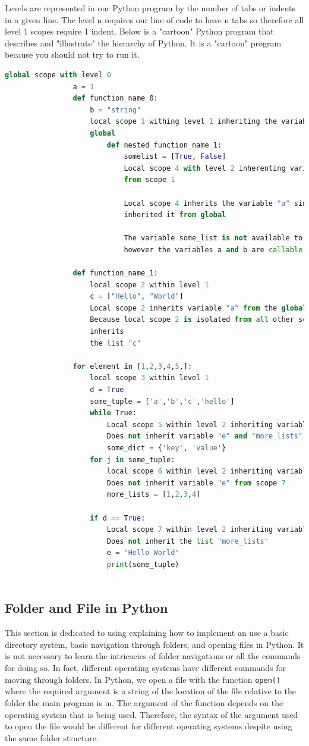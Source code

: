 \documentclass[11pt,a4paper]{book}
\begin{document}
				Levels are represented in our Python program by the number of tabs or indents in a given line. The level n requires our line of code to have n tabs so therefore all level 1 scopes require 1 indent. Below is a "cartoon" Python program that describes and "illustrate" the hierarchy of Python. It is a "cartoon" program because you should not try to run it. 
				\begin{lstlisting}[language=Python]
				global scope with level 0
				a = 1
				def function_name_0:
					b = "string"
					local scope 1 withing level 1 inheriting the variable "a" from the 
					global
						def nested_function_name_1:
							somelist = [True, False]
							Local scope 4 with level 2 inherenting variables "a" and "b" 
							from scope 1
							
							Local scope 4 inherits the variable "a" since local scope 1 
							inherited it from global
							
							The variable some_list is not available to any other scope, 
							however the variables a and b are callable within scope 4 
				
				def function_name_1:
					local scope 2 within level 1
					c = ["Hello", "World"]
					Local scope 2 inherits variable "a" from the global scope
					Because local scope 2 is isolated from all other scopes, nothing 
					inherits
					the list "c"
					
				for element in [1,2,3,4,5,]: 
					local scope 3 within level 1
					d = True
					some_tuple = ['a','b','c','hello']
					while True:
						Local scope 5 within level 2 inheriting variables "a" and "d"
						Does not inherit variable "e" and "more_lists" from scope 7
						some_dict = {'key', 'value'}
					for j in some_tuple:
						local scope 6 within level 2 inheriting variables "a" and "d"
						Does not inherit variable "e" from scope 7
						more_lists = [1,2,3,4]
						
					if d == True:
						Local scope 7 within level 2 inheriting variables "a" and "d"
						Does not inherit the list "more_lists" 
						e = "Hello World"
						print(some_tuple)
						
				\end{lstlisting}
				
			\subsection{Folder and File in Python}
				\label{sub:Folder and File in Python}
				This section is dedicated to using explaining how to implement an use a basic directory system, basic navigation through folders, and opening files in Python. It is not necessary to learn the intricacies of folder navigations or all the commands for doing so. In fact, different operating systems have different commands for moving through folders. In Python, we open a file with the function \lstinline|open()| where the required argument is a string of the location of the file relative to the folder the main program is in. The argument of the function depends on the operating system that is being used. Therefore, the syntax of the argument used to open the file would be different for different operating systems despite using the same folder structure. 
				
\end{document}
